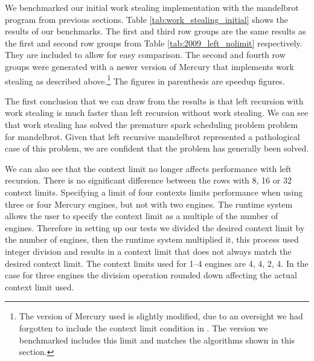 

We benchmarked our initial work stealing implementation with the mandelbrot
program from previous sections.
Table \ref{tab:work_stealing_initial} shows the results of our benchmarks.
The first and third row groups are the same results as the first and second
row groups from Table \ref{tab:2009_left_nolimit} respectively.
They are included to allow for easy comparison.
The second and fourth row groups were generated with a newer version of
Mercury that implements work stealing as described above.\footnote{
    The version of Mercury used is slightly modified,
    due to an oversight we had forgotten to include the context limit
    condition in \getglobalwork.
    The version we benchmarked includes this limit and matches the
    algorithms shown in this section.}
The figures in parenthesis are speedup figures.

The first conclusion that we can draw from the results is that
left recursion with work stealing is much faster than left recursion without
work stealing.
We can see that work stealing has solved the premature spark scheduling problem
problem for mandelbrot.
Given that left recursive mandelbrot represented a pathological case of this
problem,
we are confident that the problem has generally been solved.

We can also see that the context limit no longer affects performance
with left recursion.
There is no significant difference between the rows with 8, 16 or 32
context limits.
Specifying a limit of four contexts limits performance when using three or
four Mercury engines, but not with two engines.
The runtime system allows the user to specify the context limit as a
multiple of the number of engines.
Therefore in setting up our tests we divided the desired context limit by
the number of engines, then the runtime system multiplied it,
this process used integer division and results in a context limit that
does not always match the desired context limit.
The context limits used for 1--4 engines are 4, 4, 2, 4.
In the case for three engines the division operation rounded down affecting
the actual context limit used.

